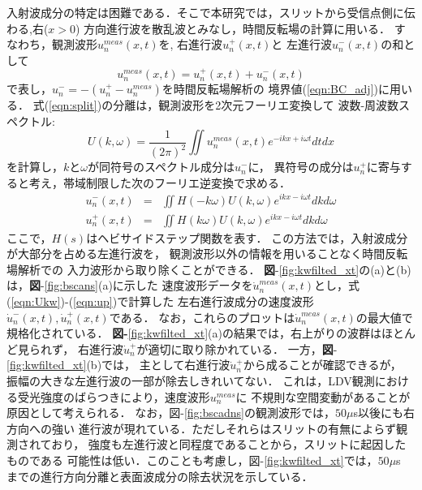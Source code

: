 入射波成分の特定は困難である．そこで本研究では，スリットから受信点側に伝わる,右($x>0$)
方向進行波を散乱波とみなし，時間反転場の計算に用いる．
すなわち，観測波形$u_n^{meas}(x,t)$を,
右進行波$u_n^{+}(x,t)$と
左進行波$u_n^{-}(x,t)$の和として
\begin{equation}
	u_n^{meas}(x,t)=u_n^{+}(x,t)+u_n^{-}(x,t)
	\label{eqn:split}
\end{equation}
で表し，$u_n^-=-(u_n^+-u_n^{meas})$を時間反転場解析の
境界値(\ref{eqn:BC_adj})に用いる．
式(\ref{eqn:split})の分離は，観測波形を2次元フーリエ変換して
波数-周波数スペクトル:
\begin{equation}
	U(k,\omega)= \frac{1}{(2\pi)^2} \iint u^{meas}_n(x,t)e^{-ikx+i\omega t}dtdx
	\label{eqn:Ukw}
\end{equation}
を計算し，$k$と$\omega$が同符号のスペクトル成分は$u_n^-$に，
異符号の成分は$u_n^+$に寄与すると考え，帯域制限した次のフーリエ逆変換で求める．
\begin{eqnarray}
	u_n^-(x,t) &=& \iint H(-k\omega)U(k,\omega)e^{ikx-i\omega t}dk d\omega
	\label{eqn:um} \\
	u_n^+(x,t) &=& \iint H(k\omega) U(k,\omega)e^{ikx-i\omega t}dk d\omega 
	\label{eqn:up}
\end{eqnarray}
ここで，$H(s)$はヘビサイドステップ関数を表す．
この方法では，入射波成分が大部分を占める左進行波を，
観測波形以外の情報を用いることなく時間反転場解析での
入力波形から取り除くことができる．
{\bf 図}-\ref{fig:kwfilted_xt}の(a)と(b)は，{\bf 図}-\ref{fig:bscans}(a)に示した
速度波形データを$\dot u_n^{meas}(x,t)$とし，式(\ref{eqn:Ukw})-(\ref{eqn:up})で計算した
左右進行波成分の速度波形$\dot{u}_n^-(x,t),\dot{u}_n^+(x,t)$である．
なお，これらのプロットは$\dot u_n^{meas}(x,t)$の最大値で規格化されている．
{\bf 図-}\ref{fig:kwfilted_xt}(a)の結果では，右上がりの波群はほとんど見られず，
右進行波$\dot u_n^+$が適切に取り除かれている．
一方，{\bf 図}-\ref{fig:kwfilted_xt}(b)では，
主として右進行波$\dot u_n^{+}$から成ることが確認できるが，
振幅の大きな左進行波の一部が除去しきれいてない．
これは，LDV観測における受光強度のばらつきにより，速度波形$u_n^{meas}$に
不規則な空間変動があることが原因として考えられる．
%
なお，{\rm 図}-\ref{fig:bscadns}の観測波形では，$50\mu$s以後にも右方向への強い
進行波が現れている．ただしそれらはスリットの有無によらず観測されており，
強度も左進行波と同程度であることから，スリットに起因したものである
可能性は低い．このことも考慮し，{\rm 図}-\ref{fig:kwfilted_xt}では，$50\mu$s
までの進行方向分離と表面波成分の除去状況を示している．
%
